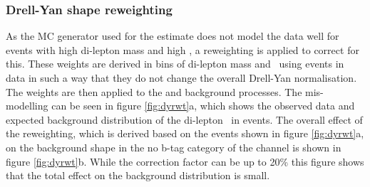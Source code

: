 \subsubsection*{Drell-Yan shape reweighting}
As the \ac{MC} generator used for the \Ztautau estimate
does not model the data well for events with high di-lepton
mass and high \pT, a reweighting is applied to correct for this.
These weights are derived in bins of di-lepton mass and 
\pT~using \Zmm events in data in such a way that they do not
change the overall Drell-Yan normalisation. The weights
are then applied to the \Ztautau and \Zellell background processes.
The mis-modelling can be seen in figure \ref{fig:dyrwt}a, which
shows the observed data and expected background distribution of the di-lepton \pT~in
\Zmm events. The overall effect of the reweighting, which is derived
based on the events shown in figure \ref{fig:dyrwt}a, on the \Ztautau background
shape in the no b-tag category of the \etau channel is shown in figure \ref{fig:dyrwt}b.
While the correction factor can be up to 20\% this figure shows
that the total effect on the \Ztautau background distribution is small.
